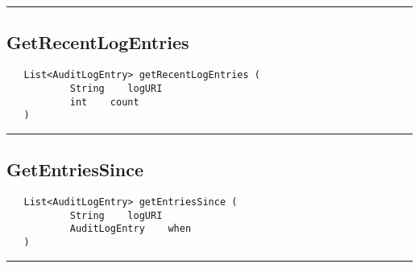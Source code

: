\rule{15cm}{2pt}
\subsection{GetRecentLogEntries}
\label{Api:GetRecentLogEntries}
\begin{verbatim}
   List<AuditLogEntry> getRecentLogEntries (
           String    logURI
           int    count
   )
\end{verbatim}



\rule{15cm}{2pt}
\subsection{GetEntriesSince}
\label{Api:GetEntriesSince}
\begin{verbatim}
   List<AuditLogEntry> getEntriesSince (
           String    logURI
           AuditLogEntry    when
   )
\end{verbatim}



\rule{15cm}{2pt}
